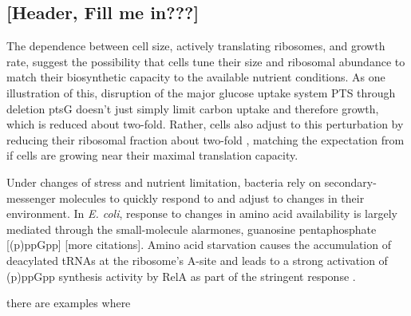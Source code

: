 



\subsection{[Header, Fill me in???]}

The dependence between cell size, actively translating ribosomes, and growth
rate, suggest the possibility that cells tune their size and ribosomal abundance
to match their biosynthetic capacity to the available nutrient conditions. As
one illustration of this, disruption of the major glucose uptake system PTS
through deletion ptsG doesn't just simply limit carbon uptake and therefore growth,
which is reduced about two-fold. Rather, cells also adjust to this perturbation
by reducing their ribosomal fraction about two-fold \citep{dai2016}, matching
the expectation from  if cells are growing
near their maximal translation capacity.

Under changes of stress and nutrient limitation, bacteria rely on
secondary-messenger molecules to quickly respond to and adjust to changes in
their environment. In \textit{E. coli}, response to changes in amino acid
availability is largely mediated through the small-molecule alarmones, guanosine
pentaphosphate [(p)ppGpp] \citep{dai2016} [more citations]. Amino acid
starvation causes the accumulation of deacylated tRNAs at the ribosome's A-site
and leads to a strong activation of (p)ppGpp synthesis activity by RelA as part
of the stringent response \citep{hauryliuk2015}.



there
are examples where

